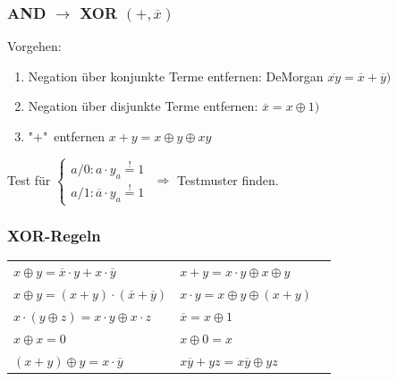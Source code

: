 \documentclass[6pt,a4paper]{scrartcl}
\newcommand{\ol}[1]{\ensuremath{\overline{#1}}}									%
\begin{document}
\begin{multicols}{3}
	\subsubsection{AND $\rightarrow$ XOR $(+,\overline x)$}
	Vorgehen:
	\begin{enumerate}\itemsep-2pt
		\item Negation über konjunkte Terme entfernen: DeMorgan $\ol {xy} = \ol x + \ol y)$
		\item Negation über disjunkte Terme entfernen: $\ol x = x \oplus 1)$
		\item "$+$"\ entfernen $x + y = x \oplus y \oplus xy$\\
	\end{enumerate}
	Test für $\begin{cases} a/0: a\cdot y_a \stackrel{!}= 1\\
	a/1: \overline a\cdot y_a \stackrel{!}= 1
	\end{cases}$
	$\Rightarrow$ Testmuster finden.
	
	\subsubsection{XOR-Regeln}
	\begin{tabular}{l l l}
				$ x \oplus y = \overline x \cdot y + x \cdot \overline y$ & $x + y = x \cdot y \oplus x \oplus y$ \\
				$x \oplus y = (x+y) \cdot (\ol x + \ol y)$ & $x \cdot y = x \oplus y \oplus (x+y)$\\
				$ x \cdot (y \oplus z) = x \cdot y \oplus x \cdot z$ & $ \overline x = x \oplus 1$ \\
				$x \oplus x = 0$ & $x \oplus 0 = x$ \\
				$(x+y)\oplus y = x \cdot \ol y$ & $x \ol y + y z = x\ol y \oplus y z$\\
		\end{tabular}
		

\end{multicols}
\end{document}
